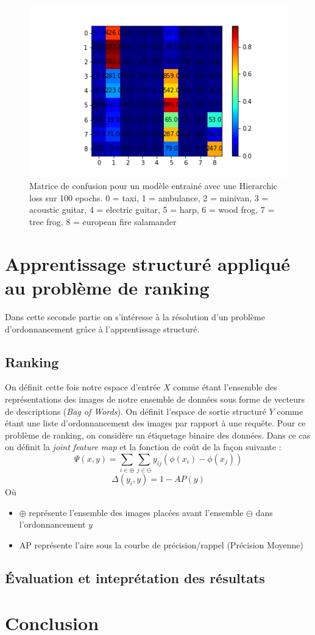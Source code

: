 \documentclass[a4paper]{article}
\begin{document}
\begin{figure}
\centering
\includegraphics[width=1\textwidth]{confusionHier.png}
\caption{\label{fig:data} Matrice de confusion pour un modèle entrainé avec une Hierarchic loss sur 100 epochs. 0 = taxi, 1 = ambulance, 2 = minivan, 3 = acoustic guitar, 4 = electric guitar, 5 = harp, 6 = wood frog, 7 = tree frog, 8 = european fire salamander}
\end{figure}


\section{Apprentissage structuré appliqué au problème de ranking }
Dans cette seconde partie on s'intéresse à la résolution d'un problème d'ordonnancement grâce à l'apprentissage structuré.
\subsection{Ranking}
On définit cette fois notre espace d'entrée $X$ comme étant l'ensemble des représentations des images de notre ensemble de données sous forme de vecteurs de descriptions (\textit{Bag of Words}). On définit l'espace de sortie structuré $Y$ comme étant une liste d'ordonnancement des images par rapport à une requête.
Pour ce problème de ranking, on considère un étiquetage binaire des données. Dans ce cas on définit la \textit{joint feature map} et la fonction de coût de la façon suivante : 
\begin{equation}
\Psi(x,y) = \sum\limits_{i \in \oplus}  \sum\limits_{j \in \ominus} y_{ij} (\phi(x_i) - \phi(x_j))
\end{equation}
\begin{equation}
\Delta(y_i,y) = 1 - AP(y)
\end{equation}
Où 
\begin{itemize}
\item $\oplus$ représente l'ensemble des images placées avant l'ensemble $\ominus$ dans l'ordonnancement $y$
\item AP représente l'aire sous la courbe de précision/rappel (Précision Moyenne)
\end{itemize}


\subsection{Évaluation et inteprétation des résultats}

\section{Conclusion}
\end{document}
